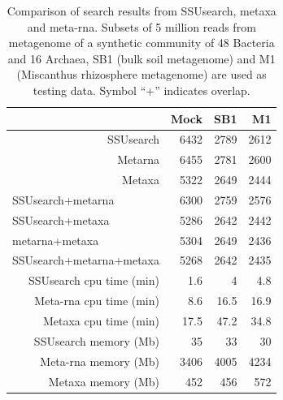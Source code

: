 \documentclass[]{msu-thesis}
\begin{document}
\begin{table}[htbp]
  \centering
  \caption[Comparison of search results from SSUsearch, metaxa and meta-rna]{Comparison of search results from SSUsearch, metaxa and meta-rna. Subsets of 5 million reads from metagenome of a synthetic community of 48 Bacteria and 16 Archaea, SB1 (bulk soil metagenome) and M1 (Miscanthus rhizosphere metagenome) are used as testing data. Symbol ``+'' indicates overlap.}
    \begin{tabular}{|r|r|r|r|}
    \toprule
          & Mock  & SB1   & M1 \\
    \midrule
    SSUsearch & 6432  & 2789  & 2612 \\
    Metarna & 6455  & 2781  & 2600 \\
    Metaxa & 5322  & 2649  & 2444 \\
    \multicolumn{1}{|l|}{SSUsearch+metarna} & 6300  & 2759  & 2576 \\
    \multicolumn{1}{|l|}{SSUsearch+metaxa} & 5286  & 2642  & 2442 \\
    \multicolumn{1}{|l|}{metarna+metaxa} & 5304  & 2649  & 2436 \\
    \multicolumn{1}{|l|}{SSUsearch+metarna+metaxa} & 5268  & 2642  & 2435 \\
    \midrule
    \midrule
    SSUsearch cpu time (min) & 1.6   & 4     & 4.8 \\
    Meta-rna cpu time (min) & 8.6   & 16.5  & 16.9 \\
    Metaxa cpu time (min) & 17.5  & 47.2  & 34.8 \\
    \midrule
    \midrule
    SSUsearch memory (Mb) & 35    & 33    & 30 \\
    Meta-rna memory (Mb) & 3406  & 4005  & 4234 \\
    Metaxa memory (Mb) & 452   & 456   & 572 \\
    \bottomrule
    \end{tabular}%
  \label{tab:chap2Tab1}%
\end{table}%
\end{document}
